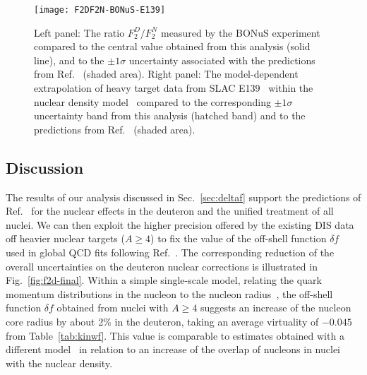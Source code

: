 \documentclass[%
      aps,
      prd,
      floatfix,
      preprintnumbers,
      preprint,
      showpacs,
      nofootinbib,
      tightenlines,
      amssymb,
      amsmath
]{revtex4-1}
\begin{document}
\begin{figure}[tb] %
\begin{center}
\texttt{[image: F2DF2N-BONuS-E139]}
\caption{%
Left panel: The ratio $F_2^D/F_2^N$ measured by the BONuS experiment~\cite{Griffioen:2015hxa} compared to  
the central value obtained from this analysis (solid line), and to the $\pm 1 \sigma$ uncertainty associated 
with the predictions from Ref.~\cite{KP04} (shaded area).  
Right panel: The model-dependent extrapolation of 
heavy target data from SLAC E139~\cite{Gomez:1993ri} within the nuclear density model~\cite{Frankfurt:1988nt} 
compared to the corresponding $\pm 1 \sigma$ uncertainty band from this analysis (hatched band) and to 
the predictions from Ref.~\cite{KP04} (shaded area). 
}
\label{fig:f2d-bonus}
\end{center}
\end{figure}



\subsection{Discussion}
\label{sec:discussion}

The results of our analysis discussed in Sec.~\ref{sec:deltaf} support the predictions 
of Ref.~\cite{KP04} for the nuclear effects in the deuteron and the unified treatment of all nuclei.  
We can then exploit the higher precision offered by the existing DIS data off heavier nuclear 
targets ($A\geq4$) to fix the value of the off-shell function $\delta f$ used in 
global QCD fits following Ref.~\cite{KP04}. 
The corresponding reduction of the overall uncertainties 
on the deuteron nuclear corrections is illustrated in Fig.~\ref{fig:f2d-final}. 
Within a simple single-scale model, relating the quark momentum distributions in the 
nucleon to the nucleon radius~\cite{KP04}, the off-shell function $\delta f$ 
obtained from nuclei with $A\geq 4$ 
suggests an increase of the nucleon core radius by about 2\% in the deuteron, taking  
an average virtuality of $-0.045$ from Table~\ref{tab:kinwf}. This value is comparable 
to estimates obtained with a different model~\cite{Close:1984zn} in relation to an 
increase of the overlap of nucleons in nuclei with the nuclear density.  
\end{document}
